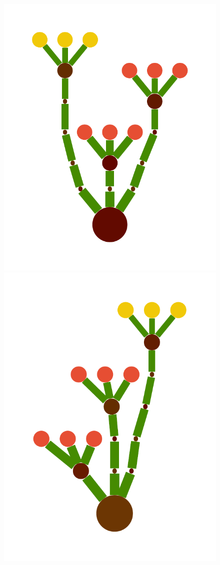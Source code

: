 \documentclass[a4paper,10pt]{article}
\begin{document}
\begin{figure}[b]
\begin{center}
\includegraphics[scale=.26]{./figures/1-tree-4.pdf}
\includegraphics[scale=.26]{./figures/1-tree-6.pdf}

\end{center}
\end{figure}
\end{document}
